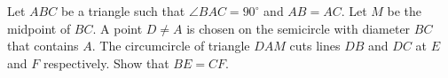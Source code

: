 Let $ABC$ be a triangle such that $\angle BAC = 90^{\circ}$ and $AB = AC$. Let $M$ be the midpoint of $BC$. A point $D \neq A$ is chosen on the semicircle with diameter $BC$ that contains $A$. The circumcircle of triangle $DAM$ cuts lines $DB$ and $DC$ at $E$ and $F$ respectively. Show that $BE = CF$.